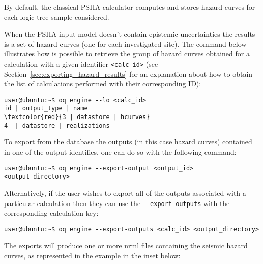 By default, the classical PSHA calculator computes and stores hazard curves
for each logic tree sample considered.

When the PSHA input model doesn't contain epistemic uncertainties the results
is a set of hazard curves (one for each investigated site). The command below
illustrates how is possible to retrieve the group of hazard curves obtained
for a calculation with a given identifier \texttt{<calc\_id>} (see
Section~\ref{sec:exporting_hazard_results} for an explanation about how to
obtain the list of calculations performed with their corresponding ID):

\begin{Verbatim}[frame=single, commandchars=\\\{\}, fontsize=\small]
user@ubuntu:~$ oq engine --lo <calc_id>
id | output_type | name
\textcolor{red}{3 | datastore | hcurves}
4  | datastore | realizations
\end{Verbatim}

%
%
%


To export from the database the outputs (in this case hazard curves)  contained in one of the output identifies, one can do so with the following command:

\begin{Verbatim}[frame=single, commandchars=\\\{\}, fontsize=\small]
user@ubuntu:~$ oq engine --export-output <output_id> <output_directory>
\end{Verbatim}

Alternatively, if the user wishes to export all of the outputs associated with a particular calculation then they can use the \texttt{-{}-export-outputs} with the corresponding calculation key:

\begin{Verbatim}[frame=single, commandchars=\\\{\}, fontsize=\small]
user@ubuntu:~$ oq engine --export-outputs <calc_id> <output_directory>
\end{Verbatim}

The exports will produce one or more nrml files containing the seismic hazard curves, as represented in the example in the inset
below:

